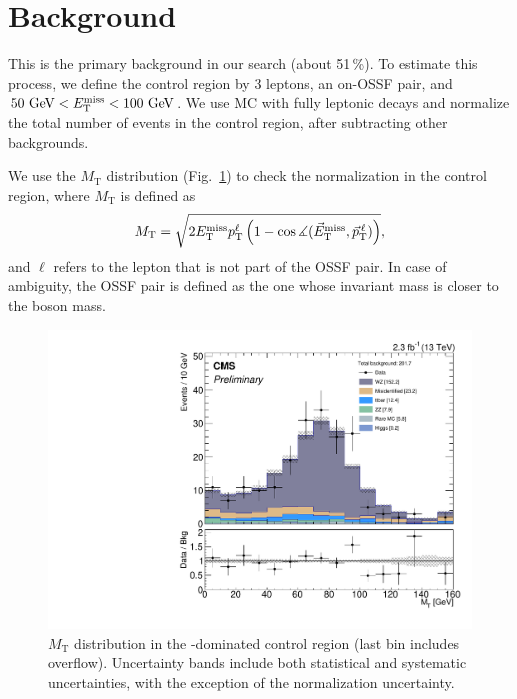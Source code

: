 \section{\texorpdfstring{\WZ}{WZ} Background}
\label{sec:bkg_WZ}

This is the primary background in our search (about 51\,\%). To estimate this process, we define the \WZ control region by 3 leptons, an on-\Z OSSF pair, and $50\,\,\text{Ge\hspace{-.08em}V} < E_{\mathrm{T}}^{\text{miss}} < 100\,\,\text{Ge\hspace{-.08em}V}$. We use \WZ MC with fully leptonic decays and normalize the total number of events in the control region, after subtracting other backgrounds.

We use the $M_\textrm{T}$ distribution (Fig.~\ref{fig:WZ}) to check the \WZ normalization in the control region, where $M_\textrm{T}$ is defined as
$$M_\textrm{T} = \sqrt{2 E_{\mathrm{T}}^{\text{miss}} p_\textrm{T}^\ell \left( 1 - \cos\measuredangle(\vec E_\textrm{T}^\text{miss}, \vec p_\textrm{T}^{\,\ell}) \right)},$$ and $\ell$ refers to the lepton that is not part of the OSSF pair. In case of ambiguity, the OSSF pair is defined as the one whose invariant mass is closer to the \Z boson mass.

\begin{figure}
\begin{center}
	\includegraphics[width=.7\textwidth]{Background/bkg_WZ/WZ_MET50to100_MT}
	\caption{$M_\textrm{T}$ distribution in the \WZ-dominated control region (last bin includes overflow). Uncertainty bands include both statistical and systematic uncertainties, with the exception of the \WZ normalization uncertainty.
	\label{fig:WZ}}
\end{center}
\end{figure}
